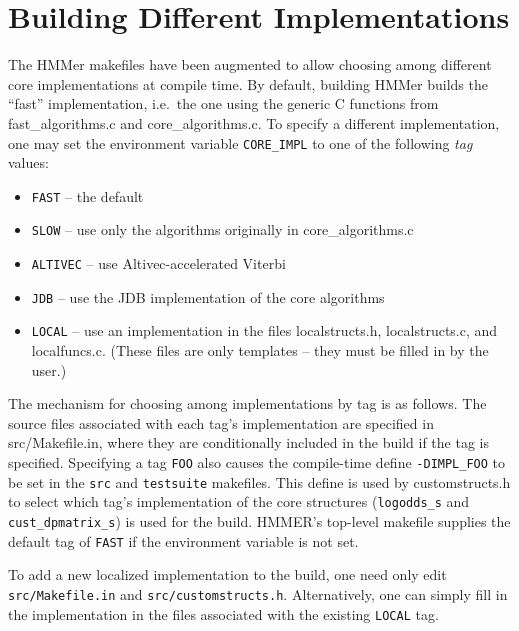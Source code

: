 \documentclass[letterpaper,10pt]{article}
\newcommand{\struct}[1]{\texttt{#1}}
\begin{document}
\section{Building Different Implementations}

The HMMer makefiles have been augmented to allow choosing among
different core implementations at compile time.  By default,
building HMMer builds the ``fast'' implementation, i.e.\ the
one using the generic C functions from fast\_algorithms.c
and core\_algorithms.c.  To specify a different implementation,
one may set the environment variable \texttt{CORE\_IMPL} to
one of the following \emph{tag} values:
\begin{itemize}
\item \texttt{FAST} -- the default

\item \texttt{SLOW} -- use only the algorithms originally in core\_algorithms.c

\item \texttt{ALTIVEC} -- use Altivec-accelerated Viterbi

\item \texttt{JDB} -- use the JDB implementation of the core algorithms

\item \texttt{LOCAL} -- use an implementation in the files
localstructs.h, localstructs.c, and localfuncs.c.  (These files are
only templates -- they must be filled in by the user.)

\end{itemize}

The mechanism for choosing among implementations by tag is as
follows.  The source files associated with each tag's implementation
are specified in src/Makefile.in, where they are conditionally
included in the build if the tag is specified.  Specifying a tag
\texttt{FOO} also causes the compile-time define \texttt{-DIMPL\_FOO}
to be set in the \texttt{src} and \texttt{testsuite} makefiles.  This
define is used by customstructs.h to select which tag's implementation
of the core structures (\struct{logodds\_s} and
\struct{cust\_dpmatrix\_s}) is used for the build.  HMMER's top-level
makefile supplies the default tag of \texttt{FAST} if the environment
variable is not set.

To add a new localized implementation to the build, one need only edit
\texttt{src/Makefile.in} and \texttt{src/customstructs.h}.
Alternatively, one can simply fill in the implementation in the files
associated with the existing \texttt{LOCAL} tag.
\end{document}

